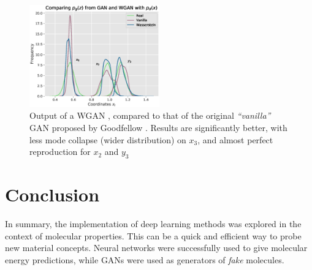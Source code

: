 \documentclass[12pt,a4paper]{article}
\begin{document}
\begin{figure}[h!]
    \centering
    \includegraphics[width=0.5\textwidth]{images/wazzer.eps}
    \caption{Output of a WGAN \cite{arjovsky_wasserstein_2017}, compared to that of the original \emph{\enquote{vanilla}} GAN proposed by Goodfellow \cite{goodfellow_generative_2014}. Results are significantly better, with less mode collapse (wider distribution) on $x_3$, and almost perfect reproduction for $x_2$ and $y_3$ }
    \label{fig:transformation}
\end{figure}
\section{Conclusion}
In summary, the implementation of deep learning methods was explored in the context of molecular properties. This can be a quick and efficient way to probe new material concepts. Neural networks were successfully used to give molecular energy predictions, while GANs were used as generators of \emph{fake} molecules.
\end{document}
